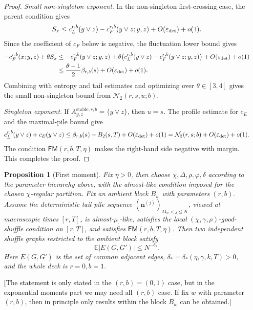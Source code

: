 \documentclass[11pt]{article}
\newtheorem{prop}{Proposition}
\newcommand{\E}{\mathbb E}
\newcommand{\bn}{\mathbf n}
\newcommand{\stable}{\mathrm{stable}}
\newcommand{\jscomment}[1]{\textup{\textsf{\color{blue}[#1]}}}
\begin{document}
\begin{proof}
\medskip
\noindent\emph{Small non-singleton exponent.}
In the non-singleton first-crossing case, the parent condition gives
\[
    S_x
    \le
    c_L^{r,b}(y\vee z)-c_F^{r,b}(y\vee z;y,z)
    +O(\varepsilon_{\rm det})+o(1).
\]
Since the coefficient of \(c_F\) below is negative, the fluctuation lower
bound gives
\[
\begin{aligned}
    -c_F^{r,b}(x;y,z)+\theta S_x
    &\le
    -c_F^{r,b}(y\vee z;y,z)
    +\theta\big(c_L^{r,b}(y\vee z)-c_F^{r,b}(y\vee z;y,z)\big)
    +O(\varepsilon_{\rm det})+o(1)\\
    &\le
    \frac{\theta-1}{2}\beta_{r,b}(s)
    +O(\varepsilon_{\rm det})+o(1).
\end{aligned}
\]
Combining with entropy and tail estimates and optimizing over
\(\theta\in[3,4]\) gives the small non-singleton bound from
\(\mathcal N_2(r,s,u;b)\).

\medskip
\noindent\emph{Singleton exponent.}
If \(A_{y,z}^{\stable,r,b}=\{y\vee z\}\), then \(u=s\). The profile
estimate for \(c_E\) and the maximal-pile bound give
\[
    c_L^{r,b}(y\vee z)+c_E(y\vee z)
    \le \beta_{r,b}(s)-B_2(s,T)
    +O(\varepsilon_{\rm det})+o(1)
    =
    \mathcal N_3(r,s;b)+O(\varepsilon_{\rm det})+o(1).
\]
The condition \(\mathsf{FM}(r,b,T,\eta)\) makes the right-hand side
negative with margin. This completes the proof.
\end{proof}

\begin{prop}[First moment]
Fix \(\eta>0\), then choose
\(\chi,\Delta,\rho,\varphi,\delta\) according to the parameter hierarchy
above, with the almost-like condition imposed for the chosen
\(\chi\)-regular partition. Fix an ambient block \(B_w\) with parameters
\((r,b)\). Assume the deterministic tail pile sequence
\((\bn^{(j)})_{M_w<j\le K}\), viewed at macroscopic times
\([r,T]\), is almost-\(\mu_\cdot\)-like, satisfies the local
\((\chi,\gamma,\rho)\)-good-shuffle condition on \([r,T]\), and satisfies
\(\mathsf{FM}(r,b,T,\eta)\). Then two independent shuffle graphs
restricted to the ambient block satisfy
\[
    \E |E(G,G')|\le N^{-\delta_*}.
\]
Here \(E(G,G')\) is the set of common adjacent edges,
\(\delta_*=\delta_*(\eta,\gamma,k,T)>0\), and the whole deck is
\(r=0,b=1\).
\end{prop}

\jscomment{The statement is only stated in the $(r,b)=(0,1)$ case, but in the exponential moments part we may need all $(r,b)$ case. If fix $w$ with parameter $(r,b)$, then in principle only results within the block $B_w$ can be obtained.}
\end{document}
